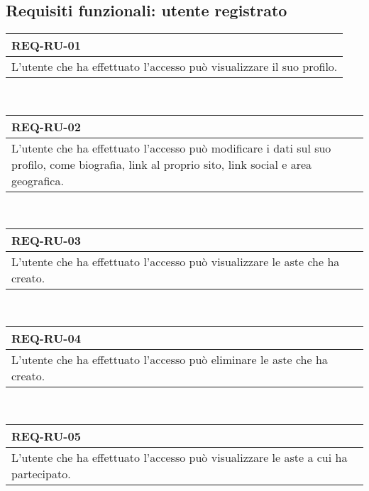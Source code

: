         \subsection{Requisiti funzionali: utente registrato}
        \begin{tabular}{|p{}|}
            \hline
            \multicolumn{1}{|l|}{\cellcolor{head}\textbf{REQ-RU-01}} \\
            \hline
            L'utente che ha effettuato l'accesso può visualizzare il suo profilo. \\
            \hline
        \end{tabular} \smallskip \\
        \begin{tabular}{|p{}|}
            \hline
            \multicolumn{1}{|l|}{\cellcolor{head}\textbf{REQ-RU-02}} \\
            \hline
            L'utente che ha effettuato l'accesso può modificare i dati sul suo profilo, come biografia, link al proprio sito, link social e area geografica. \\
            \hline
        \end{tabular} \smallskip \\
        \begin{tabular}{|p{}|}
            \hline
            \multicolumn{1}{|l|}{\cellcolor{head}\textbf{REQ-RU-03}} \\
            \hline
            L'utente che ha effettuato l'accesso può visualizzare le aste che ha creato. \\
            \hline
        \end{tabular} \smallskip \\
        \begin{tabular}{|p{}|}
            \hline
            \multicolumn{1}{|l|}{\cellcolor{head}\textbf{REQ-RU-04}} \\
            \hline
            L'utente che ha effettuato l'accesso può eliminare le aste che ha creato. \\
            \hline
        \end{tabular} \smallskip \\
        \begin{tabular}{|p{}|}
            \hline
            \multicolumn{1}{|l|}{\cellcolor{head}\textbf{REQ-RU-05}} \\
            \hline
            L'utente che ha effettuato l'accesso può visualizzare le aste a cui ha partecipato. \\
            \hline
        \end{tabular} \smallskip \\

